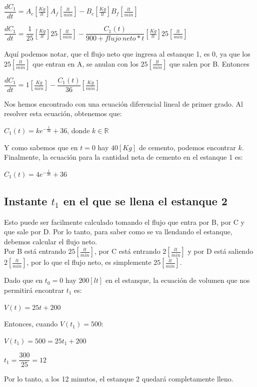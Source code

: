 \documentclass[12pt,letterpaper]{article}
\begin{document}
\begin{center}
$\dfrac{dC_1}{dt} = A_c[\frac{Kg}{lt}]A_f[\frac{lt}{min}] - B_c[\frac{Kg}{lt}]B_f[\frac{lt}{min}]$
\end{center}
\begin{center}
$\dfrac{dC_1}{dt} = \dfrac{1}{25}[\frac{Kg}{lt}]25[\frac{lt}{min}] - \dfrac{C_1(t)}{900 + flujo\ neto*t}[\frac{Kg}{lt}]25[\frac{lt}{min}]$
\end{center}

Aquí podemos notar, que el flujo neto que ingresa al estanque 1, es 0, ya que los $25 [\frac{lt}{min}]$ que entran en A, se anulan con los $25 [\frac{lt}{min}]$ que salen por B. Entonces

\begin{center}
$\dfrac{dC_1}{dt} =1[\frac{Kg}{min}] - \dfrac{C_1(t)}{36}[\frac{Kg}{min}]$
\end{center}

Nos hemos encontrado con una ecuación diferencial lineal de primer grado. Al resolver esta ecuación, obtenemos que:

\begin{center}
$C_1(t) = k e^{-\frac{t}{36}}+36$, donde $k\in\mathbb{R}$
\end{center}

Y como sabemos que en $t=0$ hay $40[Kg]$ de cemento, podemos encontrar $k$. Finalmente, la ecuación para la cantidad neta de cemento en el estanque 1 es: 

\begin{center}
$C_1(t) = 4 e^{-\frac{t}{36}}+36$
\end{center}

\subsection{Instante $t_1$ en el que se llena el estanque 2}

Esto puede ser facilmente calculado tomando el flujo que entra por B, por C y que sale por D. Por lo tanto, para saber como se va llendando el estanque, debemos calcular el flujo neto.\\

Por B está entrando $25 [\frac{lt}{min}]$, por C está entrando $2 [\frac{lt}{min}]$ y por D está saliendo $2 [\frac{lt}{min}]$, por lo que el flujo neto, es simplemente $25 [\frac{lt}{min}]$.

Dado que en $t_0 = 0$ hay $200 [lt]$ en el estanque, la ecuación de volumen que nos permitirá encontrar $t_1$ es:

\begin{center}
$V(t) = 25t+200$
\end{center}

Entonces, cuando $V(t_1)=500$:
\begin{center}
$V(t_1) = 500 = 25t_1+200$
\end{center}
\begin{center}
$t_1=\dfrac{300}{25}=12$
\end{center}

Por lo tanto, a los 12 minutos, el estanque 2 quedará completamente lleno.
\end{document}
